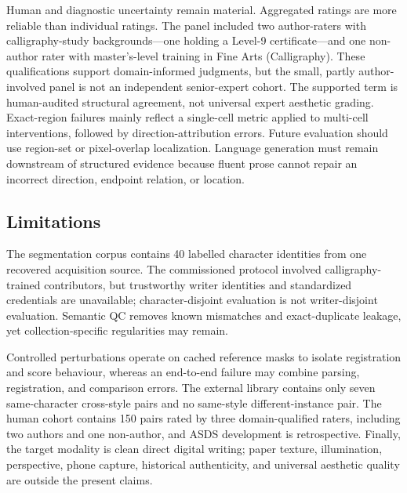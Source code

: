 Human and diagnostic uncertainty remain material. Aggregated ratings are
more reliable than individual ratings. The panel included two author-raters
with calligraphy-study backgrounds---one holding a Level-9 certificate---and
one non-author rater with master's-level training in Fine Arts
(Calligraphy). These qualifications support domain-informed judgments, but
the small, partly author-involved panel is not an independent senior-expert
cohort. The supported term is human-audited structural agreement, not
universal expert aesthetic grading. Exact-region failures mainly reflect a
single-cell metric applied to multi-cell interventions, followed by
direction-attribution errors. Future evaluation should use region-set or
pixel-overlap localization. Language generation must remain downstream of
structured evidence because fluent prose cannot repair an incorrect
direction, endpoint relation, or location.

\subsection{Limitations}

The segmentation corpus contains 40 labelled character identities from one
recovered acquisition source. The commissioned protocol involved
calligraphy-trained contributors, but trustworthy writer identities and
standardized credentials are unavailable; character-disjoint evaluation is
not writer-disjoint evaluation. Semantic QC removes known mismatches and
exact-duplicate leakage, yet collection-specific regularities may remain.

Controlled perturbations operate on cached reference masks to isolate
registration and score behaviour, whereas an end-to-end failure may combine
parsing, registration, and comparison errors. The external library contains
only seven same-character cross-style pairs and no same-style
different-instance pair. The human cohort contains 150 pairs rated by three
domain-qualified raters, including two authors and one non-author, and ASDS
development is retrospective. Finally, the target modality is clean direct
digital writing; paper texture, illumination, perspective, phone capture,
historical authenticity, and universal aesthetic quality are outside the
present claims.
